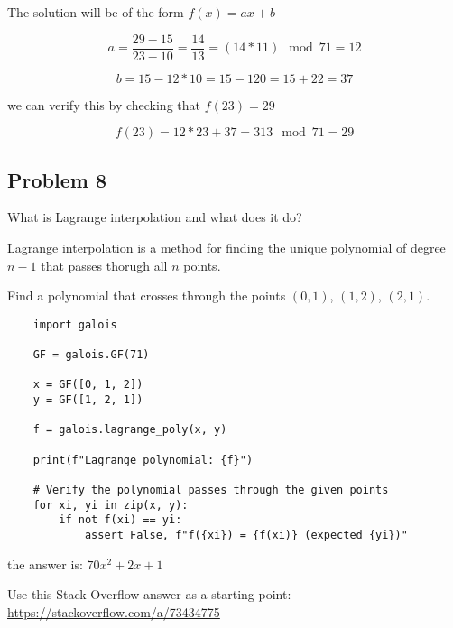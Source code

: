 \documentclass{article}
\begin{document}
The solution will be of the form $f(x) = ax + b$

\[
a = \frac{29-15}{23-10} = \frac{14}{13} = (14 * 11) \mod 71 = 12
\]

\[b = 15 - 12 * 10 = 15 - 120 = 15 + 22= 37\]

we can verify this by checking that $f(23) = 29$

\[
f(23) = 12 * 23 + 37 = 313 \mod 71 = 29
\]

\subsection*{Problem 8}
What is Lagrange interpolation and what does it do?

Lagrange interpolation is a method for finding the unique polynomial of degree $n-1$ that passes thorugh all $n$ points.

Find a polynomial that crosses through the points $(0, 1)$, $(1, 2)$, $(2, 1)$.

\begin{lstlisting}
    import galois

    GF = galois.GF(71)

    x = GF([0, 1, 2])
    y = GF([1, 2, 1])

    f = galois.lagrange_poly(x, y)

    print(f"Lagrange polynomial: {f}")

    # Verify the polynomial passes through the given points
    for xi, yi in zip(x, y):
        if not f(xi) == yi:
            assert False, f"f({xi}) = {f(xi)} (expected {yi})"
\end{lstlisting}

the answer is: $70x^2 + 2x + 1$

Use this Stack Overflow answer as a starting point: \url{https://stackoverflow.com/a/73434775}
\end{document}
